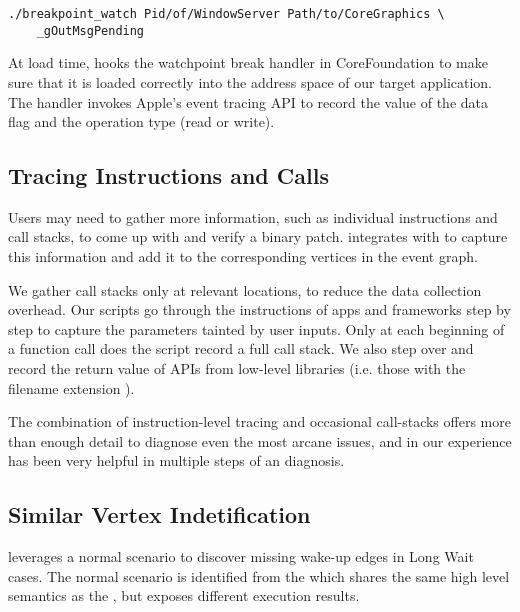 \begin{lstlisting}
./breakpoint_watch Pid/of/WindowServer Path/to/CoreGraphics \
	_gOutMsgPending
\end{lstlisting}

At load time, \xxx hooks the watchpoint break handler in CoreFoundation to
make sure that it is loaded correctly into the address space of our target
application. The handler invokes Apple's event tracing API to record the value
of the data flag and the operation type (read or write).

\subsection{Tracing Instructions and Calls}

Users may need to gather more information, such as individual instructions and
call stacks, to come up with and verify a binary patch. \xxx integrates with
\vv{lldb} to capture this information and add it to the corresponding vertices
in the event graph.

We gather call stacks only at relevant locations, to reduce the data collection
overhead. Our \vv{lldb} scripts go through the instructions of apps and
frameworks step by step to capture the parameters tainted by user inputs. Only
at each beginning of a function call does the script record a full call stack.
We also step over and record the return value of APIs from low-level libraries
(i.e. those with the filename extension \vv{.dylib}).

The combination of instruction-level tracing and occasional call-stacks offers
more than enough detail to diagnose even the most arcane issues, and in our
experience has been very helpful in multiple steps of an \xxx diagnosis.

\subsection{Similar Vertex Indetification}

\xxx leverages a normal scenario to discover missing wake-up edges in Long Wait
cases. The normal scenario is identified from the \similarnode which shares
the same high level semantics as the \spinningnode, but exposes different
execution results.

